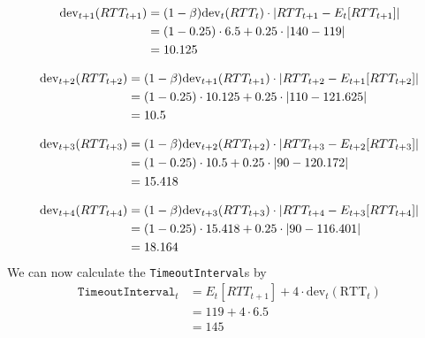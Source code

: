 \begin{equation*}
    \begin{split}
        \text{dev}_{t+1}(RTT_{t+1}) &= (1 - \beta) \text{dev}_{t}(RTT_{t}) \cdot \left |RTT_{t+1} - E_{t}[RTT_{t+1}]\right| \\
        &=  (1 - 0.25) \cdot 6.5 + 0.25 \cdot \left |140 - 119\right| \\
        &= 10.125
\end{split}
\end{equation*}

\begin{equation*}
    \begin{split}
        \text{dev}_{t+2}(RTT_{t+2}) &= (1 - \beta) \text{dev}_{t+1}(RTT_{t+1}) \cdot \left |RTT_{t+2} - E_{t+1}[RTT_{t+2}]\right| \\
        &=  (1 - 0.25) \cdot 10.125 + 0.25 \cdot \left |110 - 121.625\right| \\
        &= 10.5
\end{split}
\end{equation*}

\begin{equation*}
    \begin{split}
        \text{dev}_{t+3}(RTT_{t+3}) &= (1 - \beta) \text{dev}_{t+2}(RTT_{t+2}) \cdot \left |RTT_{t+3} - E_{t+2}[RTT_{t+3}]\right| \\
        &=  (1 - 0.25) \cdot 10.5 + 0.25 \cdot \left |90 - 120.172\right| \\
        &= 15.418
\end{split}
\end{equation*}

\begin{equation*}
    \begin{split}
        \text{dev}_{t+4}(RTT_{t+4}) &= (1 - \beta) \text{dev}_{t+3}(RTT_{t+3}) \cdot \left |RTT_{t+4} - E_{t+3}[RTT_{t+4}]\right| \\
        &=  (1 - 0.25) \cdot 15.418 + 0.25 \cdot \left |90 - 116.401\right| \\
        &= 18.164
\end{split}
\end{equation*}
We can now calculate the \texttt{TimeoutInterval}s by 
\begin{equation*}
\begin{split}
    \texttt{TimeoutInterval}_t &= E_t[RTT_{t+1}] + 4 \cdot \text{dev}_t(\text{RTT}_t) \\
    &= 119 + 4 \cdot 6.5 \\
    &= 145
\end{split}
\end{equation*}

